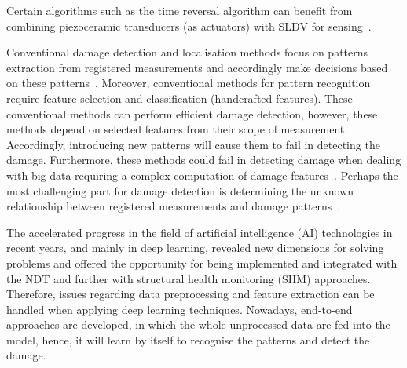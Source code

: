 \documentclass[preprint,9pt]{elsarticle}
\begin{document}
Certain algorithms such as the time reversal algorithm can benefit from combining piezoceramic transducers (as actuators) with SLDV for sensing~\cite{Girolamo2018a, Miniaci2019}.

Conventional damage detection and localisation methods focus on patterns extraction from registered measurements and accordingly make decisions based on these patterns~\cite{Gul2009}. 
Moreover, conventional methods for pattern recognition require feature selection and classification (handcrafted features). 
These conventional methods can perform efficient damage detection, however, these methods depend on selected features from their scope of measurement.
Accordingly, introducing new patterns will cause them to fail in detecting the damage.
Furthermore, these methods could fail in detecting damage when dealing with big data requiring a complex computation of damage features~\cite{Gulgec2019}.
Perhaps the most challenging part for damage detection is determining the unknown relationship between registered measurements and damage patterns~\cite{Gulgec2019}. 

The accelerated progress in the field of artificial intelligence (AI) technologies in recent years, and mainly in deep learning, revealed new dimensions for solving problems and offered the opportunity for being implemented and integrated with the NDT and further with structural health monitoring (SHM) approaches.
Therefore, issues regarding data preprocessing and feature extraction can be handled when applying deep learning techniques. 
Nowadays, end-to-end approaches are developed, in which the whole unprocessed data are fed into the model, hence, it will learn by itself to recognise the patterns and detect the damage.
\end{document}
